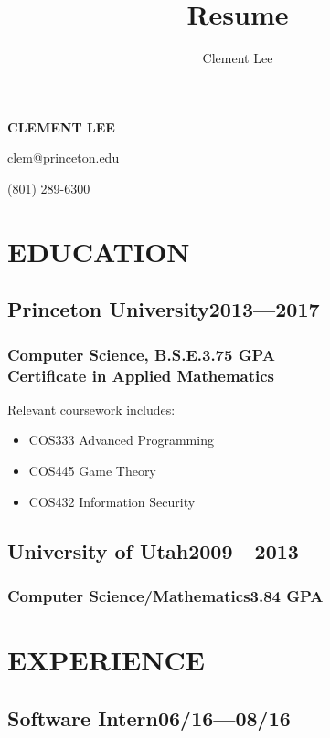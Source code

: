 \documentclass[11pt]{article}
\author{Clement Lee}
\title{Resume}
\begin{document}
\vspace*{1.5em}

{\huge\textbf{CLEMENT LEE}}
\vspace{0.25\baselineskip}

clem@princeton.edu

(801) 289-6300

\vspace{\baselineskip}
\begin{multicols}{2}
  \section*{EDUCATION}
  \subsection*{Princeton University\hfill\textnormal{2013---2017}}
  \subsubsection*{Computer Science, B.S.E.\hfill\textnormal{3.75 GPA}\\
    Certificate in Applied Mathematics}

  Relevant coursework includes:
  \begin{itemize}[noitemsep,nolistsep,leftmargin=*]
    \item COS333 Advanced Programming
    \item COS445 Game Theory
    \item COS432 Information Security
  \end{itemize}

  \subsection*{University of Utah\hfill\textnormal{2009---2013}}
  \subsubsection*{Computer Science/Mathematics\hfill\textnormal{3.84 GPA}}
  \vspace{\baselineskip}

  \section*{EXPERIENCE}
  \subsection*{Software Intern\hfill\textnormal{06/16---08/16}}

\end{multicols}
\end{document}
